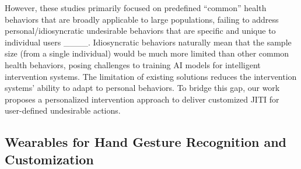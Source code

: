 
However, these studies primarily focused on predefined ``common'' health behaviors that are broadly applicable to large populations, failing to address personal/idiosyncratic undesirable behaviors that are specific and unique to individual users ____. 
Idiosyncratic behaviors naturally mean that the sample size (from a single individual) would be much more limited than other common health behaviors, posing challenges to training AI models for intelligent intervention systems.
The limitation of existing solutions reduces the intervention systems' ability to adapt to personal behaviors.
To bridge this gap, our work proposes a personalized intervention approach to deliver customized JITI for user-defined undesirable actions.



\subsection{Wearables for Hand Gesture Recognition and Customization}


